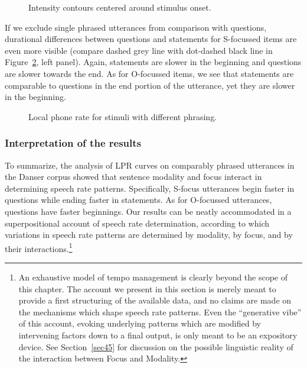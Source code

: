\begin{figure}[!htbp]
\centering
{}
\caption{Intensity contours centered around stimulus onset.}
\label{fig405}\end{figure}

If we exclude single phrased utterances from comparison with questions, durational differences between questions and statements for S-focussed items are even more visible (compare dashed grey line with dot-dashed black line in Figure~\ref{fig406}, left panel). Again, statements are slower in the beginning and questions are slower towards the end. As for O-focussed items, we see that statements are comparable to questions in the end portion of the utterance, yet they are slower in the beginning. 

\begin{figure}[!htbp]
\centering
{}
\caption{Local phone rate for stimuli with different phrasing.}
\label{fig406}\end{figure}

\subsubsection{Interpretation of the results}\label{sec4442}
To summarize, the analysis of LPR curves on comparably phrased utterances in the Danser corpus showed that sentence modality and focus interact in determining speech rate patterns. Specifically, S-focus utterances begin faster in questions while ending faster in statements. As for O-focussed utterances, questions have faster beginnings. Our results can be neatly accommodated in a superpositional account of speech rate determination, according to which variations in speech rate patterns are determined by modality, by focus, and by their interactions.\footnote{An exhaustive model of tempo management is clearly beyond the scope of this chapter. The account we present in this section is merely meant to provide a first structuring of the available data, and no claims are made on the mechanisms which shape speech rate patterns. Even the ``generative vibe'' of this account, evoking underlying patterns which are modified by intervening factors down to a final output, is only meant to be an expository device. See Section~\ref{sec45} for discussion on the possible linguistic reality of the interaction between Focus and Modality.} 

